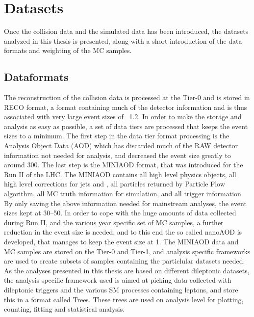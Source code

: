 \section{Datasets}
\noindent
\justify
Once the collision data and the simulated data has been introduced, the datasets analyzed in this thesis is presented, along with a short introduction of the data formats and weighting of the MC samples. 
\subsection*{Dataformats}
\noindent
\justify
The reconstruction of the collision data is processed at the Tier-0 and is stored in RECO format, a format containing much of the detector information and is thus associated with very large event sizes of ~1.2\MB. 
In order to make the storage and analysis as easy as possible, a set of data tiers are processed that keeps the event sizes to a minimum.
The first step in the data tier format processing is the Analysis Object Data (AOD) which has discarded much of the RAW detector information not needed for analysis, and decreased the event size greatly to around 300\kB. 
The last step is the MINIAOD format, that was introduced for the Run II of the LHC. 
The MINIAOD contains all high level physics objects, all high level corrections for jets and \ptmiss, all particles returned by Particle Flow algorithm, all MC truth information for simulation, and all trigger information. 
By only saving the above information needed for mainstream analyses, the event sizes kept at 30--50\kB. 
In order to cope with the huge amounts of data collected during Run II, and the various year specific set of MC samples, a further reduction in the event size is needed, and to this end the so called nanoAOD is developed, that manages to keep the event size at 1\kB.  
The MINIAOD data and MC samples are stored on the Tier-0 and Tier-1, and analysis specific frameworks are used to create subsets of samples containing the particlular datasets needed. 
As the analyses presented in this thesis are based on different dileptonic datasets, the analysis specific framework used is aimed at picking data collected with dileptonic triggers and the various SM processes containing leptons, and store this in a format called Trees. 
These trees are used on analysis level for plotting, counting, fitting and statistical analysis.      

